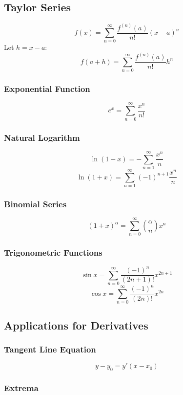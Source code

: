 \documentclass{article}
\begin{document}
\subsection{Taylor Series}

\[
    f(x) = \sum_{n=0}^{\infty} \frac{f^{(n)}(a)}{n!}(x - a)^n
\]
Let $h = x - a$:
\[
    f(a + h) = \sum_{n=0}^{\infty} \frac{f^{(n)}(a)}{n!}h^n
\]

\subsubsection{Exponential Function}

\[
    e^x = \sum_{n=0}^{\infty} \frac{x^n}{n!}
\]

\subsubsection{Natural Logarithm}

\[
    \ln(1 - x) = -\sum_{n=1}^{\infty} \frac{x^n}{n}
\]
\[
    \ln(1 + x) = \sum_{n=1}^{\infty} (-1)^{n+1} \frac{x^n}{n}
\]

\subsubsection{Binomial Series}

\[
    (1 + x)^\alpha = \sum_{n=0}^{\infty} \binom{\alpha}{n} x^n
\]

\subsubsection{Trigonometric Functions}

\[
    \sin x = \sum_{n=0}^{\infty} \frac{(-1)^n}{(2n + 1)!} x^{2n + 1}
\]
\[
    \cos x = \sum_{n=0}^{\infty} \frac{(-1)^n}{(2n)!} x^{2n}
\]

\subsection{Applications for Derivatives}

\subsubsection{Tangent Line Equation}

\[
    y - y_0 = y'(x - x_0)
\]

\subsubsection{Extrema}
\end{document}
